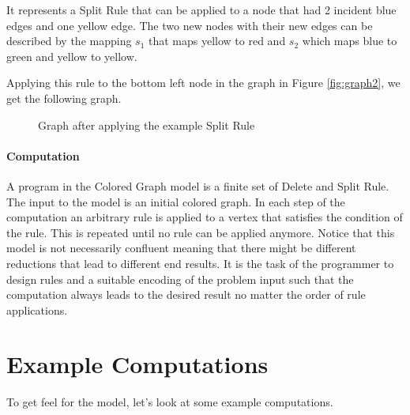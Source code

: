 \documentclass{article}
\begin{document}
It represents a Split Rule that can be applied to a node that had 2 incident blue edges and one yellow edge.
The two new nodes with their new edges can be described by the mapping $s_1$ that maps yellow to red and $s_2$ which maps blue to green and yellow to yellow.

Applying this rule to the bottom left node in the graph in Figure \ref{fig:graph2}, we get the following graph.

\begin{figure}[H]
    \label{fig:graph3}
    \centering
    \caption{Graph after applying the example Split Rule}
\end{figure}

\paragraph*{Computation}
A program in the Colored Graph model is a finite set of Delete and Split Rule.
The input to the model is an initial colored graph.
In each step of the computation an arbitrary rule is applied to a vertex that satisfies the condition of the rule.
This is repeated until no rule can be applied anymore.
Notice that this model is not necessarily confluent meaning that there might be different reductions that lead to different end results.
It is the task of the programmer to design rules and a suitable encoding of the problem input such that the computation always leads to the desired result no matter the order of rule applications.

\section{Example Computations}

To get feel for the model, let's look at some example computations.
\end{document}
